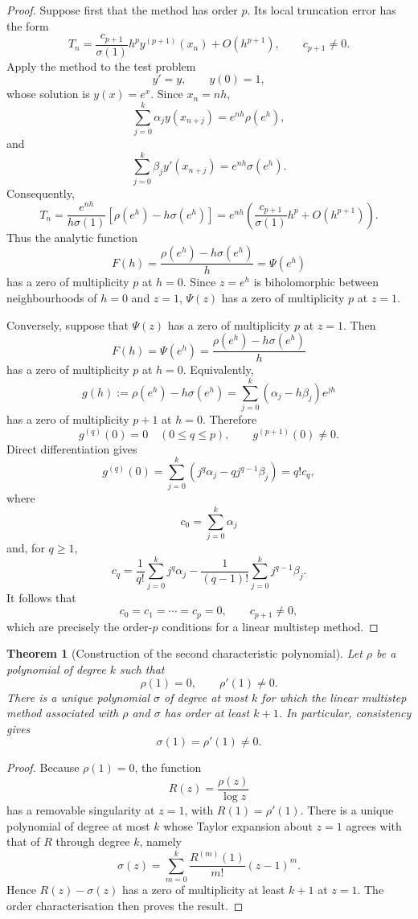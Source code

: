 \documentclass[11pt,a4paper]{article}
\numberwithin{equation}{section}
\theoremstyle{spacedplain}
\newtheorem{theorem}{Theorem}[section]
\theoremstyle{spaceddefinition}
\theoremstyle{spacedremark}
\begin{document}
\begin{proof}
Suppose first that the method has order \(p\).  Its local truncation
error has the form
\[
  T_n=
  \frac{c_{p+1}}{\sigma(1)}
  h^p y^{(p+1)}(x_n)+O(h^{p+1}),
  \qquad c_{p+1}\ne0.
\]
Apply the method to the test problem
\[
  y'=y,\qquad y(0)=1,
\]
whose solution is \(y(x)=e^x\).  Since \(x_n=nh\),
\[
  \sum_{j=0}^k\alpha_jy(x_{n+j})
  =e^{nh}\rho(e^h),
\]
and
\[
  \sum_{j=0}^k\beta_jy'(x_{n+j})
  =e^{nh}\sigma(e^h).
\]
Consequently,
\[
  T_n
  =\frac{e^{nh}}{h\sigma(1)}
    \left[\rho(e^h)-h\sigma(e^h)\right]
  =e^{nh}\left(
    \frac{c_{p+1}}{\sigma(1)}h^p+O(h^{p+1})
  \right).
\]
Thus the analytic function
\[
  F(h)=\frac{\rho(e^h)-h\sigma(e^h)}{h}
      =\Psi(e^h)
\]
has a zero of multiplicity \(p\) at \(h=0\).  Since \(z=e^h\) is
biholomorphic between neighbourhoods of \(h=0\) and \(z=1\),
\(\Psi(z)\) has a zero of multiplicity \(p\) at \(z=1\).

Conversely, suppose that \(\Psi(z)\) has a zero of multiplicity \(p\)
at \(z=1\).  Then
\[
  F(h)=\Psi(e^h)
  =\frac{\rho(e^h)-h\sigma(e^h)}{h}
\]
has a zero of multiplicity \(p\) at \(h=0\).  Equivalently,
\[
  g(h):=\rho(e^h)-h\sigma(e^h)
  =\sum_{j=0}^k(\alpha_j-h\beta_j)e^{jh}
\]
has a zero of multiplicity \(p+1\) at \(h=0\).  Therefore
\[
  g^{(q)}(0)=0\quad(0\le q\le p),
  \qquad
  g^{(p+1)}(0)\ne0.
\]
Direct differentiation gives
\[
  g^{(q)}(0)
  =\sum_{j=0}^k
    \left(j^q\alpha_j-qj^{q-1}\beta_j\right)
  =q!c_q,
\]
where
\[
  c_0=\sum_{j=0}^k\alpha_j
\]
and, for \(q\ge1\),
\[
  c_q=
  \frac{1}{q!}\sum_{j=0}^k j^q\alpha_j
  -\frac{1}{(q-1)!}\sum_{j=0}^k j^{q-1}\beta_j.
\]
It follows that
\[
  c_0=c_1=\cdots=c_p=0,
  \qquad c_{p+1}\ne0,
\]
which are precisely the order-\(p\) conditions for a linear multistep
method.
\end{proof}

\begin{theorem}[Construction of the second characteristic polynomial]
Let \(\rho\) be a polynomial of degree \(k\) such that
\[
  \rho(1)=0,\qquad \rho'(1)\ne0.
\]
There is a unique polynomial \(\sigma\) of degree at most \(k\) for
which the linear multistep method associated with \(\rho\) and
\(\sigma\) has order at least \(k+1\).  In particular, consistency gives
\[
  \sigma(1)=\rho'(1)\ne0.
\]
\end{theorem}

\begin{proof}
Because \(\rho(1)=0\), the function
\[
  R(z)=\frac{\rho(z)}{\log z}
\]
has a removable singularity at \(z=1\), with \(R(1)=\rho'(1)\).
There is a unique polynomial of degree at most \(k\) whose
Taylor expansion about \(z=1\) agrees with that of \(R\) through degree
\(k\), namely
\[
  \sigma(z)=
  \sum_{m=0}^{k}
  \frac{R^{(m)}(1)}{m!}(z-1)^m.
\]
Hence \(R(z)-\sigma(z)\) has a zero of multiplicity at least
\(k+1\) at \(z=1\).  The order characterisation then proves
the result.
\end{proof}
\end{document}
